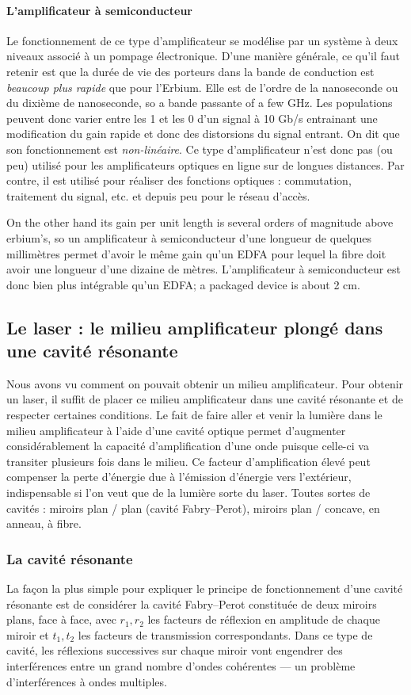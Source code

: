 \paragraph{L'amplificateur à semiconducteur}
Le fonctionnement de ce type d'amplificateur se modélise par un système à deux
niveaux associé à un pompage électronique. D'une manière générale, ce qu'il
faut retenir est que la durée de vie des porteurs dans la bande de conduction
est \emph{beaucoup plus rapide} que pour l'Erbium. Elle est de l'ordre de la
nanoseconde ou du dixième de nanoseconde, so a bande passante of a few GHz. Les
populations peuvent donc varier entre les 1 et les 0 d'un signal à 10 Gb/s
entrainant une modification du gain rapide et donc des distorsions du signal
entrant. On dit que son fonctionnement est \emph{non-linéaire}. Ce type
d'amplificateur n'est donc pas (ou peu) utilisé pour les amplificateurs optiques
en ligne sur de longues distances. Par contre, il est utilisé pour réaliser des
fonctions optiques : commutation, traitement du signal, etc. et depuis peu pour
le réseau d'accès.

On the other hand its gain per unit length is several orders of magnitude above
erbium's, so un amplificateur à semiconducteur d'une longueur de quelques
millimètres permet d'avoir le même gain qu'un EDFA pour lequel la fibre doit
avoir une longueur d'une dizaine de mètres. L'amplificateur à semiconducteur est
donc bien plus intégrable qu'un EDFA; a packaged device is about 2 cm.

\subsection{Le laser : le milieu amplificateur plongé dans une cavité résonante}
Nous avons vu comment on pouvait obtenir un milieu amplificateur. Pour obtenir
un laser, il suffit de placer ce milieu amplificateur dans une cavité résonante
et de respecter certaines conditions. Le fait de faire aller et venir la lumière
dans le milieu amplificateur à l'aide d'une cavité optique permet d'augmenter
considérablement la capacité d'amplification d'une onde puisque celle-ci va
transiter plusieurs fois dans le milieu. Ce facteur d'amplification élevé peut
compenser la perte d'énergie due à l'émission d'énergie vers l'extérieur,
indispensable si l'on veut que de la lumière sorte du laser. Toutes sortes de
cavités : miroirs plan / plan (cavité Fabry--Perot), miroirs plan / concave, en
anneau, à fibre.

\subsubsection{La cavité résonante}
La façon la plus simple pour expliquer le principe de fonctionnement d'une
cavité résonante est de considérer la cavité Fabry--Perot constituée de deux
miroirs plans, face à face, avec $r_1,r_2$ les facteurs de réflexion en
amplitude de chaque miroir et $t_1,t_2$ les facteurs de transmission
correspondants. Dans ce type de cavité, les réflexions successives sur chaque
miroir vont engendrer des interférences entre un grand nombre d'ondes
cohérentes --- un problème d'interférences à ondes multiples.

